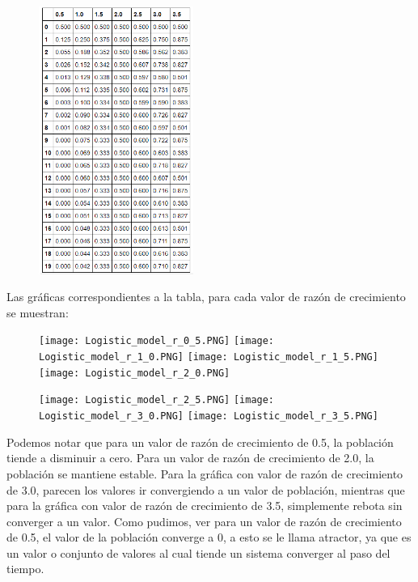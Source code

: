 \documentclass[a4paper]{article}
\begin{document}
\begin{figure}[ht!]
\centering
\includegraphics[width=0.45\textwidth]{Tabla.PNG}
\end{figure}
 
 \newpage

Las gráficas correspondientes a la tabla, para cada valor de razón de crecimiento se muestran:


\begin{figure}[ht!]
\centering
\texttt{[image: Logistic\_model\_r\_0\_5.PNG]}
\texttt{[image: Logistic\_model\_r\_1\_0.PNG]}
\texttt{[image: Logistic\_model\_r\_1\_5.PNG]}
\texttt{[image: Logistic\_model\_r\_2\_0.PNG]}
\end{figure}

\begin{figure}[ht!]
\centering
\texttt{[image: Logistic\_model\_r\_2\_5.PNG]}
\texttt{[image: Logistic\_model\_r\_3\_0.PNG]}
\texttt{[image: Logistic\_model\_r\_3\_5.PNG]}
\end{figure}
\newpage

Podemos notar que para un valor de razón de crecimiento de 0.5, la población tiende a disminuir a cero. Para un valor de razón de crecimiento de 2.0, la población se mantiene estable. Para la gráfica con valor de razón de crecimiento de 3.0, parecen los valores ir convergiendo a un valor de población, mientras que para la gráfica con valor de razón de crecimiento de 3.5, simplemente rebota sin converger a un valor. Como pudimos, ver para un valor de razón de crecimiento de 0.5, el valor de la población converge a 0, a esto se le llama atractor, ya que es un valor o conjunto de valores al cual tiende un sistema converger al paso del tiempo.
\end{document}
